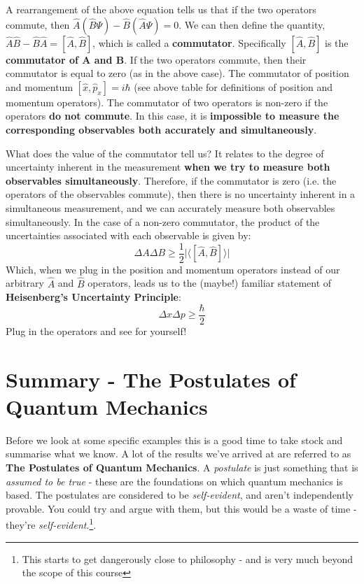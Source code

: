 \documentclass{memoir}[11pt,oneside,a4paper,openany]
\newcommand{\wf}{\ensuremath{\Psi}\xspace}
\begin{document}
A rearrangement of the above equation tells us that if the two operators commute, then $\hat{A}(\hat{B}\wf)-\hat{B}(\hat{A}\wf) = 0$. We can then define the quantity, $\hat{A}\hat{B}-\hat{B}\hat{A} = [\hat{A},\hat{B}]$, which is called a \textbf{commutator}. Specifically $[\hat{A},\hat{B}]$ is the \textbf{commutator of A and B}. If the two operators commute, then their commutator is equal to zero (as in the above case). The commutator of position and momentum $[\hat{x},\hat{p}_x] = i\hbar$ (see above table for definitions of position and momentum operators). The commutator of two operators is non-zero if the operators \textbf{do not commute}. In this case, it is \textbf{impossible to measure the corresponding observables both accurately and simultaneously}.

What does the value of the commutator tell us? It relates to the degree of uncertainty inherent in the measurement \textbf{when we try to measure both observables simultaneously}. Therefore, if the commutator is zero (i.e. the operators of the observables commute), then there is no uncertainty inherent in a simultaneous measurement, and we can accurately measure both observables simultaneously. In the case of a non-zero commutator, the product of the uncertainties associated with each observable is given by:
\begin{equation}
	\Delta A \Delta B \geq \frac{1}{2} \lvert \langle [\hat{A},\hat{B}] \rangle \rvert
\end{equation}
Which, when we plug in the position and momentum operators instead of our arbitrary $\hat{A}$ and $\hat{B}$ operators, leads us to the (maybe!) familiar statement of \textbf{Heisenberg's Uncertainty Principle}:
\begin{equation}
	\Delta x \Delta p \geq \frac{\hbar}{2}
\end{equation}
Plug in the operators and see for yourself!

\section{Summary - The Postulates of Quantum Mechanics}
Before we look at some specific examples this is a good time to take stock and summarise what we know. A lot of the results we've arrived at are referred to as \textbf{The Postulates of Quantum Mechanics}. A \emph{postulate} is just something that is \emph{assumed to be true} - these are the foundations on which quantum mechanics is based. The postulates are considered to be \emph{self-evident}, and aren't independently provable. You could try and argue with them, but this would be a waste of time - they're \emph{self-evident}.\footnote{This starts to get dangerously close to philosophy - and is very much beyond the scope of this course}.
\end{document}
